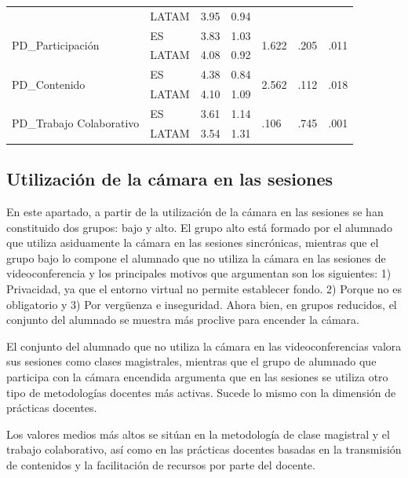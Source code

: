 \documentclass[spanish]{textolivre}
\begin{document}
\begin{table}[h]
\begin{threeparttable}
\begin{tabular}{*{7}{l}}
    & LATAM & 3.95 & 0.94 & & & \\
    \multirow{2}{*}{PD\_Participación} & ES & 3.83 & 1.03 & \multirow{2}{*}{1.622} & \multirow{2}{*}{.205} & \multirow{2}{*}{.011} \\
    & LATAM & 4.08 & 0.92 & & & \\
    \multirow{2}{*}{PD\_Contenido} & ES & 4.38 & 0.84 & \multirow{2}{*}{2.562} & \multirow{2}{*}{.112} & \multirow{2}{*}{.018} \\
    & LATAM & 4.10 & 1.09 & & & \\
    \multirow{2}{*}{PD\_Trabajo Colaborativo} & ES & 3.61 & 1.14 & \multirow{2}{*}{.106} & \multirow{2}{*}{.745} & \multirow{2}{*}{.001} \\
    & LATAM & 3.54 & 1.31 & & & \\
    \bottomrule
    \end{tabular}
    \end{threeparttable}
\end{table}


\subsection{Utilización de la cámara en las sesiones}
En este apartado, a partir de la utilización de la cámara en las sesiones se han constituido dos grupos: bajo y alto. El grupo alto está formado por el alumnado que utiliza asiduamente la cámara en las sesiones sincrónicas, mientras que el grupo bajo lo compone el alumnado que no utiliza la cámara en las sesiones de videoconferencia y los principales motivos que argumentan son los siguientes: 1) Privacidad, ya que el entorno virtual no permite establecer fondo. 2) Porque no es obligatorio y 3) Por vergüenza e inseguridad. Ahora bien, en grupos reducidos, el conjunto del alumnado se muestra más proclive para encender la cámara.

El conjunto del alumnado que no utiliza la cámara en las videoconferencias valora sus sesiones como clases magistrales, mientras que el grupo de alumnado que participa con la cámara encendida argumenta que en las sesiones se utiliza otro tipo de metodologías docentes más activas. Sucede lo mismo con la dimensión de prácticas docentes.

Los valores medios más altos se sitúan en la metodología de clase magistral y el trabajo colaborativo, así como en las prácticas docentes basadas en la transmisión de contenidos y la facilitación de recursos por parte del docente.  
\end{document}
